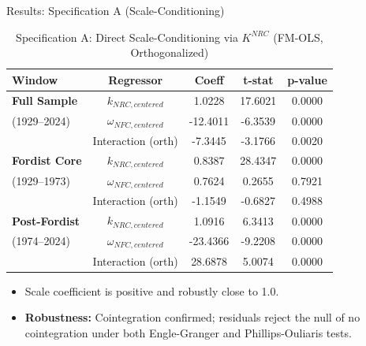\documentclass[10pt]{beamer}
\begin{document}
\begin{frame}{Results: Specification A (Scale-Conditioning)}
  \begin{table}[htbp]
    \centering
    \caption{Specification A: Direct Scale-Conditioning via $K^{NRC}$ (FM-OLS, Orthogonalized)}
    \footnotesize
    \begin{tabular}{lcccc}
      \toprule
      \textbf{Window} & \textbf{Regressor} & \textbf{Coeff} & \textbf{t-stat} & \textbf{p-value} \\
      \midrule
      \textbf{Full Sample} & $k_{NRC, centered}$ & 1.0228 & 17.6021 & 0.0000 \\
      (1929--2024) & $\omega_{NFC, centered}$ & -12.4011 & -6.3539 & 0.0000 \\
      & Interaction (orth) & -7.3445 & -3.1766 & 0.0020 \\
      \midrule
      \textbf{Fordist Core} & $k_{NRC, centered}$ & 0.8387 & 28.4347 & 0.0000 \\
      (1929--1973) & $\omega_{NFC, centered}$ & 0.7624 & 0.2655 & 0.7921 \\
      & Interaction (orth) & -1.1549 & -0.6827 & 0.4988 \\
      \midrule
      \textbf{Post-Fordist} & $k_{NRC, centered}$ & 1.0916 & 6.3413 & 0.0000 \\
      (1974--2024) & $\omega_{NFC, centered}$ & -23.4366 & -9.2208 & 0.0000 \\
      & Interaction (orth) & 28.6878 & 5.0074 & 0.0000 \\
      \bottomrule
    \end{tabular}
  \end{table}
  \begin{itemize}
    \item Scale coefficient is positive and robustly close to 1.0.
    \item \textbf{Robustness:} Cointegration confirmed; residuals reject the null of no cointegration under both Engle-Granger and Phillips-Ouliaris tests.
  \end{itemize}
\end{frame}
\end{document}
